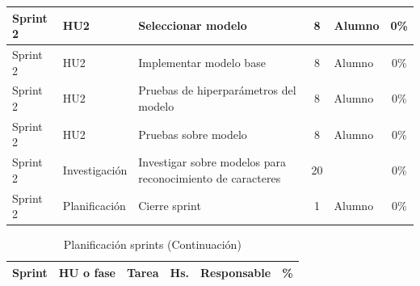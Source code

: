 \documentclass[
11pt, %
]{charter}
\begin{document}
\begin{table}[htpb]
\begin{tabularx}{\linewidth}{@{}|l|l|X|c|l|c|@{}}
Sprint 2	&	HU2	&	Seleccionar modelo	&	8	&	Alumno	&	0\%	\\ \hline
Sprint 2	&	HU2	&	Implementar modelo base	&	8	&	Alumno	&	0\%	\\ \hline
Sprint 2	&	HU2	&	Pruebas de hiperparámetros del modelo	&	8	&	Alumno	&	0\%	\\ \hline
Sprint 2	&	HU2	&	Pruebas sobre modelo	&	8	&	Alumno	&	0\%	\\ \hline
Sprint 2	&	Investigación	&	Investigar sobre modelos para reconocimiento de caracteres	&	20	&		&	0\%	\\ \hline
Sprint 2	&	Planificación	&	Cierre sprint	&	1	&	Alumno	&	0\%	\\ \hline

\end{tabularx}
\end{table}
\begin{table}[htpb]
\centering
\caption{Planificación sprints (Continuación)}
\begin{tabularx}{\linewidth}{@{}|l|l|X|c|l|c|@{}}
\hline
\rowcolor[HTML]{C0C0C0}
Sprint	&	HU o fase	&	Tarea	&	Hs.	&	Responsable	&	\%	\\ \hline


\end{tabularx}
\end{table}
\end{document}
